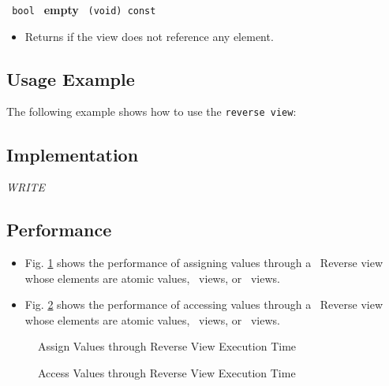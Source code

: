 \noindent
\texttt{%
bool
}
\newline
\textbf{empty}%
\texttt{%
(void) const
}

\begin{itemize}
\item
Returns if the view does not reference any element.
\end{itemize}

\subsection{Usage Example} \label{sec-rev-vw-use}

The following example shows how to use the \texttt{reverse view}:


\subsection{Implementation} \label{sec-rev-vw-impl}

\textit{WRITE}

\subsection{Performance} \label{sec-rev-vw-perf}

\begin{itemize}
\item
Fig. \ref{fig:rev-vw-assign-exper}
shows the performance of assigning values through a \stapl\ Reverse view
whose elements are atomic values, \stl\ views, or \stapl\ views.
\item
Fig. \ref{fig:rev-vw-access-exper}
shows the performance of accessing values through a \stapl\ Reverse view
whose elements are atomic values, \stl\ views, or \stapl\ views.
\end{itemize}

\begin{figure}[p]
\caption{Assign Values through Reverse View Execution Time}
\label{fig:rev-vw-assign-exper}
\end{figure}

\begin{figure}[p]
\caption{Access Values through Reverse View Execution Time}
\label{fig:rev-vw-access-exper}
\end{figure}

